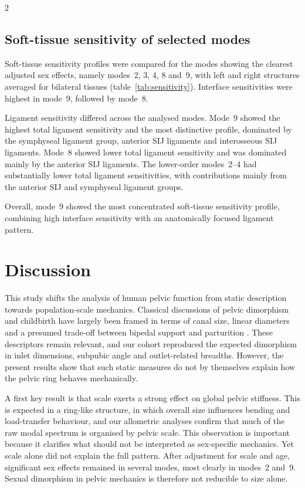 \documentclass[openacc]{rsproca_new}
\begin{document}
\begin{multicols}{2}
\subsection{Soft-tissue sensitivity of selected modes}

Soft-tissue sensitivity profiles were compared for the modes showing the clearest adjusted sex effects, namely modes~2, 3, 4, 8 and~9, with left and right structures averaged for bilateral tissues (table~\ref{tab:sensitivity}). Interface sensitivities were highest in mode~9, followed by mode~8.

Ligament sensitivity differed across the analysed modes. Mode~9 showed the highest total ligament sensitivity and the most distinctive profile, dominated by the symphyseal ligament group, anterior SIJ ligaments and interosseous SIJ ligaments. Mode~8 showed lower total ligament sensitivity and was dominated mainly by the anterior SIJ ligaments. The lower-order modes~2--4 had substantially lower total ligament sensitivities, with contributions mainly from the anterior SIJ and symphyseal ligament groups.

Overall, mode~9 showed the most concentrated soft-tissue sensitivity profile, combining high interface sensitivity with an anatomically focused ligament pattern.

\section{Discussion}

This study shifts the analysis of human pelvic function from static description towards population-scale mechanics. Classical discussions of pelvic dimorphism and childbirth have largely been framed in terms of canal size, linear diameters and a presumed trade-off between bipedal support and parturition \cite{RosenbergTrevathan2002,Trevathan2015,Grunstra2023}. These descriptors remain relevant, and our cohort reproduced the expected dimorphism in inlet dimensions, subpubic angle and outlet-related breadths. However, the present results show that such static measures do not by themselves explain how the pelvic ring behaves mechanically.

A first key result is that scale exerts a strong effect on global pelvic stiffness. This is expected in a ring-like structure, in which overall size influences bending and load-transfer behaviour, and our allometric analyses confirm that much of the raw modal spectrum is organised by pelvic scale. This observation is important because it clarifies what should not be interpreted as sex-specific mechanics. Yet scale alone did not explain the full pattern. After adjustment for scale and age, significant sex effects remained in several modes, most clearly in modes~2 and~9. Sexual dimorphism in pelvic mechanics is therefore not reducible to size alone.


\end{multicols}
\end{document}
